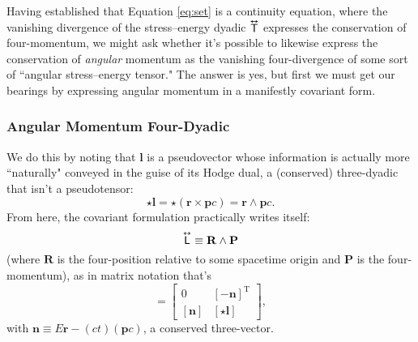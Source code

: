 \documentclass[12pt]{article}
\renewcommand{\vv}[1]{\mathbf{#1}}
\newcommand{\tightoverset}[2]{%
  \mathop{#2}\limits^{\vbox to -.5ex{\kern-0.75ex\hbox{$#1$}\vss}}}
\newcommand{\inlinedy}[1]{\tightoverset{\text{\tiny$\bm\leftrightarrow$}}{#1}}
\newcommand{\capdy}[1]{ \overset{ \text{\tiny$\bm\leftrightarrow$} }{\vphantom{\text{\small{A}}}\smash{#1}} }
\begin{document}
Having established that Equation \ref{eq:set} is a continuity equation, where the vanishing divergence of the stress--energy dyadic $\inlinedy{\mathsf{T}}$ expresses the conservation of four-momentum, we might ask whether it's possible to likewise express the conservation of \emph{angular} momentum as the vanishing four-divergence of some sort of ``angular stress--energy tensor." The answer is yes, but first we must get our bearings by expressing angular momentum in a manifestly covariant form. 

\subsubsection{Angular Momentum Four-Dyadic}

We do this by noting that $\vv l$ is a pseudovector whose information is actually more ``naturally" conveyed in the guise of its Hodge dual, a (conserved) three-dyadic that isn't a pseudotensor:
\begin{equation*}
\star \vv l =  \star ( \vv r \times \vv p c ) = \vv r \wedge \vv p c .
\end{equation*}
From here, the covariant formulation practically writes itself:
\begin{equation*}
\capdy{\mathsf{L}} \equiv \vv R \wedge \vv P
\end{equation*}
(where $\vv R$ is the four-position relative to some spacetime origin and $\vv P$ is the four-momentum), as in matrix notation that's
\begin{equation*}
[ \capdy{\mathsf{L}} ]
=
\begin{bmatrix}
0 & [ - \vv n ]^\mathrm{T} \\[1ex]
[ \vv n ] & [ \star \vv l ]
\end{bmatrix} ,
\end{equation*}
with $\vv n \equiv E \vv r - (ct)(\vv p c)$, a conserved three-vector.
\end{document}
